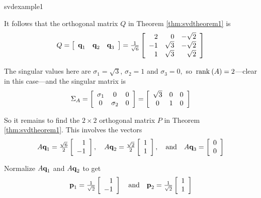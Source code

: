 \begin{example}{}{svdexample1}
\begin{solution}
\noindent It follows that the orthogonal matrix $Q$ in Theorem \ref{thm:svdtheorem1} is
\begin{equation*}
Q=\left[ \begin{array}{ccc}\textbf{q}_{1} & \textbf{q}_{2} & \textbf{q}_{3}\end{array}\right]=\tfrac{1}{\sqrt{6}}
\left[ 
\begin{array}{rrr}
2 & 0 & -\sqrt{2} \\ 
-1 & \sqrt{3} & -\sqrt{2} \\ 
1 & \sqrt{3} & \sqrt{2}
\end{array}
\right] 
\end{equation*}

\noindent The singular values here are $\sigma_{1}=\sqrt{3}$, $\sigma_{2}=1 $ and $\sigma_{3}=0,$ so $\thinspace\operatorname{rank\medspace}(A)=2$---clear in this case---and the singular matrix is
\begin{equation*}
\Sigma_{A}=
\left[
\begin{array}{ccc}
\sigma_{1} & 0 & 0 \\ 
0 & \sigma_{2} & 0
\end{array}
\right] =\left[
\begin{array}{ccc}
\sqrt{3} & 0 & 0 \\ 
0 & 1 & 0
\end{array}
\right] 
\end{equation*}

\noindent So it remains to find the $2\times 2$ orthogonal matrix $P$ in
Theorem \ref{thm:svdtheorem1}. This involves the vectors 
\begin{equation*}
A\textbf{q}_{1}=\tfrac{\sqrt{6}}{2}
\left[ 
\begin{array}{r}
1 \\ 
-1
\end{array}
\right],\quad  A\textbf{q}_{2}=\tfrac{\sqrt{2}}{2}
\left[ 
\begin{array}{c}
1 \\ 
1
\end{array}
\right] ,\quad  \mbox{and} \quad A\textbf{q}_{3}=
\left[ 
\begin{array}{c}
0 \\ 
0
\end{array}
\right] 
\end{equation*}

\noindent Normalize $A\textbf{q}_{1}$ and $A\textbf{q}_{2}$ to get
\begin{equation*}
\textbf{p}_{1}=\tfrac{1}{\sqrt{2}}
\left[ 
\begin{array}{r}
1 \\ 
-1
\end{array}
\right]  \quad  \mbox{and} \quad \textbf{p}_{2}=\tfrac{1}{\sqrt{2}}
\left[
\begin{array}{c}
1 \\ 
1
\end{array}
\right] 
\end{equation*}


\end{solution}
\end{example}

